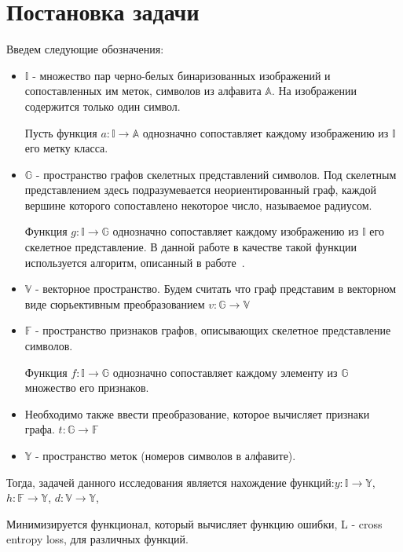 \documentclass{llncs}
\begin{document}
\section{Постановка задачи}

Введем следующие обозначения: 
\begin{itemize}
\item $\mathbb{I}$ - множество пар черно-белых бинаризованных изображений и сопоставленных им меток, символов из алфавита $\mathbb{A}$. На изображении содержится только один символ. 

Пусть функция $a: \mathbb{I} \rightarrow \mathbb{A}$ однозначно сопоставляет каждому изображению из $\mathbb{I}$ его метку класса.

\item $\mathbb{G}$ - пространство графов скелетных представлений символов. Под скелетным представлением здесь подразумевается неориентированный граф, каждой вершине которого сопоставлено некоторое число, называемое радиусом.

Функция $g: \mathbb{I} \rightarrow \mathbb{G}$ однозначно сопоставляет каждому изображению из $\mathbb{I}$ его скелетное представление. В данной работе в качестве такой функции используется алгоритм, описанный в работе~\cite{cnn_1}.

\item $\mathbb{V}$ - векторное пространство. Будем считать что граф представим в векторном виде сюрьективным преобразованием $v: \mathbb{G} \rightarrow \mathbb{V}$

\item $\mathbb{F}$ - пространство признаков графов, описывающих скелетное представление символов.

Функция $f: \mathbb{I} \rightarrow \mathbb{G}$ однозначно сопоставляет каждому элементу из $\mathbb{G}$ множество его признаков.

\item Необходимо также ввести преобразование, которое вычисляет признаки графа. $t: \mathbb{G} \rightarrow \mathbb{F}$

\item $\mathbb{Y}$ - пространство меток (номеров символов в алфавите).
\end{itemize}

Тогда, задачей данного исследования является нахождение функций:$y: \mathbb{I} \rightarrow \mathbb{Y}$, $h: \mathbb{F} \rightarrow \mathbb{Y}$, $d: \mathbb{V} \rightarrow \mathbb{Y}$,
 
Минимизируется функционал, который вычисляет функцию ошибки, L - cross entropy loss, для различных функций.
\end{document}

